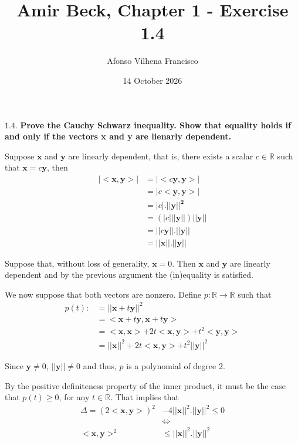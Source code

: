 \documentclass{article}
\title{Amir Beck, Chapter 1 - Exercise 1.4}
\author{Afonso Vilhena Francisco}
\date{14 October 2026}
\begin{document}
\maketitle

$\mathbf{1.4.}$ \textbf{Prove the Cauchy Schwarz inequality. Show that equality holds if and only if the vectors x and y are lienarly dependent.}

\vspace{0.3cm}

Suppose $\mathbf{x}$ and $\mathbf{y}$ are linearly dependent, that is, there exists a scalar $c \in \mathbb{R}$ such that $\mathbf{x}=c\mathbf{y}$, then
\begin{align*}
    |<\mathbf{x,\mathbf{y}}>| &= |<c \mathbf{y}, \mathbf{y}>|\\
    &=|c<\mathbf{y}, \mathbf{y}>|\\
    &=|c|.||\mathbf{y||^2}\\
    &= (|c|||\mathbf{y}||)||\mathbf{y}||\\
    &= ||c \mathbf{y||.||y||}\\
    &=||\mathbf{x}||.||\mathbf{y||}
\end{align*}

Suppose that, without loss of generality, $\mathbf{x}=0$. Then $\mathbf{x}$ and $\mathbf{y}$ are linearly dependent and by the previous argument the (in)equality is satisfied.

\vspace{0.2cm}

We now suppose that both vectors are nonzero. Define $p: \mathbb{R} \rightarrow \mathbb{R}$ such that 
\begin{align*}
    p(t) :& =||\mathbf{x}+t\mathbf{y}||^2\\
          & =<\mathbf{x}+t\mathbf{y},\mathbf{x}+t\mathbf{y}>\\
          & = <\mathbf{x}, \mathbf{x}>+2t<\mathbf{x},\mathbf{y}>+t^2<\mathbf{y},\mathbf{y}>\\
          & = ||\mathbf{x}||^2+2t<\mathbf{x},\mathbf{y}>+t^2||\mathbf{y}||^2
\end{align*}

Since $\mathbf{y} \neq 0$, $||\mathbf{y}|| \neq 0$ and thus, $p$ is a polynomial of degree 2.

By the positive definiteness property of the inner product, it must be the case that $p(t) \geq 0$, for any $t \in \mathbb{R}$. That implies that
\begin{align*}
    \Delta=(2<\mathbf{x},\mathbf{y}>)^2&-4||\mathbf{x}||^2.||\mathbf{y}||^2 \leq 0\\
    &\Leftrightarrow\\
    <\mathbf{x},\mathbf{y}>^2 &\leq ||\mathbf{x}||^2.||\mathbf{y}||^2
\end{align*}
\end{document}
